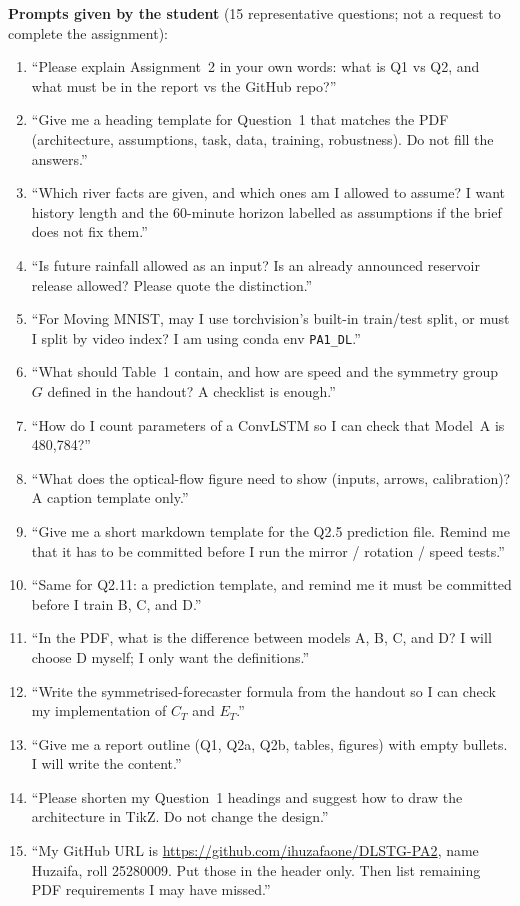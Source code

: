 \noindent\textbf{Prompts given by the student} (15 representative questions; not a request to complete the assignment):
\begin{enumerate}[leftmargin=*,itemsep=0.6pt]
\item ``Please explain Assignment~2 in your own words: what is Q1 vs Q2, and what must be in the report vs the GitHub repo?''
\item ``Give me a heading template for Question~1 that matches the PDF (architecture, assumptions, task, data, training, robustness). Do not fill the answers.''
\item ``Which river facts are given, and which ones am I allowed to assume? I want history length and the 60-minute horizon labelled as assumptions if the brief does not fix them.''
\item ``Is future rainfall allowed as an input? Is an already announced reservoir release allowed? Please quote the distinction.''
\item ``For Moving MNIST, may I use torchvision's built-in train/test split, or must I split by video index? I am using conda env \texttt{PA1\_DL}.''
\item ``What should Table~1 contain, and how are speed and the symmetry group $G$ defined in the handout? A checklist is enough.''
\item ``How do I count parameters of a ConvLSTM so I can check that Model~A is 480{,}784?''
\item ``What does the optical-flow figure need to show (inputs, arrows, calibration)? A caption template only.''
\item ``Give me a short markdown template for the Q2.5 prediction file. Remind me that it has to be committed before I run the mirror / rotation / speed tests.''
\item ``Same for Q2.11: a prediction template, and remind me it must be committed before I train B, C, and D.''
\item ``In the PDF, what is the difference between models A, B, C, and D? I will choose D myself; I only want the definitions.''
\item ``Write the symmetrised-forecaster formula from the handout so I can check my implementation of $C_T$ and $E_T$.''
\item ``Give me a report outline (Q1, Q2a, Q2b, tables, figures) with empty bullets. I will write the content.''
\item ``Please shorten my Question~1 headings and suggest how to draw the architecture in TikZ. Do not change the design.''
\item ``My GitHub URL is \url{https://github.com/ihuzafaone/DLSTG-PA2}, name Huzaifa, roll 25280009. Put those in the header only. Then list remaining PDF requirements I may have missed.''
\end{enumerate}

